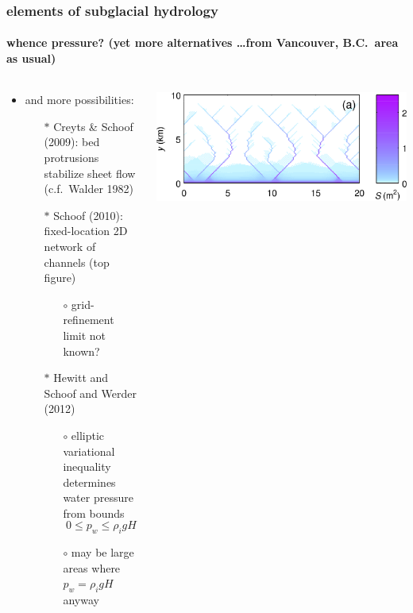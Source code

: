 \documentclass[hide notes,intlimits]{beamer}
\begin{document}
\begin{frame}
  \frametitle{elements of subglacial hydrology}
  \framesubtitle{whence pressure? (yet more alternatives \dots from Vancouver, B.C.~area as usual)}

\begin{columns}
\begin{column}{0.6\textwidth}
  \begin{itemize}
  \item and more possibilities:
  \begin{itemize}
  \item[$\ast$]  Creyts \& Schoof (2009): bed protrusions stabilize sheet flow (c.f.~Walder 1982)

  \bigskip
  \item[$\ast$]  Schoof (2010): fixed-location 2D network of channels (top figure)
      \begin{itemize}
      \item[$\circ$] grid-refinement limit not known?
      \end{itemize}
      
  \bigskip
  \item[$\ast$]  Hewitt and Schoof and Werder (2012)
      \begin{itemize}
      \vspace{-3mm}
      \item[$\circ$] elliptic variational inequality determines water pressure from bounds
      $$0 \le p_w \le \rho_i g H$$
      \item[$\circ$] may be large areas where $p_w = \rho_i g H$ anyway
      \end{itemize}
  \end{itemize}
  \end{itemize}
\end{column}

\begin{column}{0.4\textwidth}
\begin{center}
\includegraphics[width=1.0\textwidth]{figs/schoof-channels}


\end{center}
\end{column}
\end{columns}
\end{frame}
\end{document}
